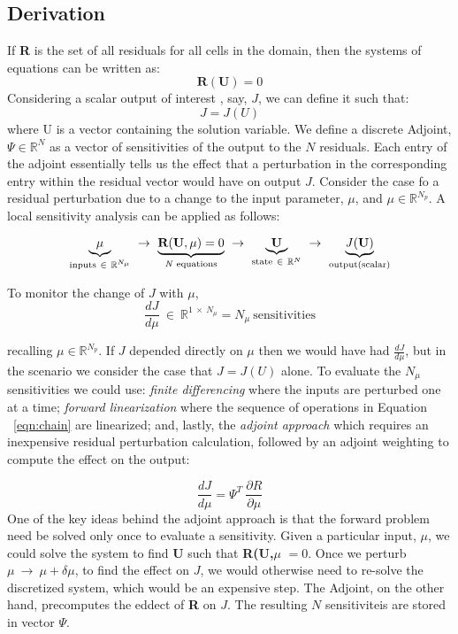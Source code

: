 \subsection{Derivation}
If \textbf{R} is the set of all residuals for all cells in the domain, then the systems of equations can be written as:
\begin{equation}
\textbf{R}(\textbf{U}) = 0
\end{equation}
Considering a scalar output of interest \cite{Fidkowski:2013}, say, $J$, we can define it such that:
\begin{equation}
J = J(U)
\end{equation}
where U is a vector containing the solution variable. We define a discrete Adjoint, $\Psi \in \mathbb{R}^N$ as a vector of sensitivities of the output to the $N$ residuals. Each entry of the adjoint essentially tells us the effect that a perturbation in the corresponding entry within the residual vector would have on output $J$. Consider the case fo a residual perturbation due to a change to the input parameter, $\mu$, and $\mu \in \mathbb{R}^{N_p}$. A local sensitivity analysis can be applied as follows:\par
\begin{equation} \label{eqn:chain}
\underbrace{\mu}_{\text{inputs} ~\in~\mathbb{R}^{N_\mu}} ~\to~ \underbrace{\textbf{R}(\textbf{U},\textbf{$\mu$}) = 0}_{\text{\textit{N} equations}} ~ \to ~ \underbrace{\textbf{U}}_{\text{state} ~\in~ \mathbb{R}^N} ~\to~ \underbrace{\text{\textit{J}(\textbf{U})}}_\text{output(scalar)} 
\end{equation}

To monitor the change of $J$ with $\mu$,
\begin{equation}
\frac{dJ}{d\mu} ~\in~ \mathbb{R}^{1~\times~N_{\mu}} = N_\mu ~ \text{sensitivities}
\end{equation}

recalling $\mu \in \mathbb{R}^{N_p}$. If $J$ depended directly on $\mu$ then we would have had $\frac{dJ}{d\mu}$, but in the scenario we consider the case that $J = J(U)$ alone. To evaluate the $N_\mu$ sensitivities we could use: \textit{finite differencing} where the inputs are  perturbed one at a time;  \textit{forward linearization} where the sequence of operations in Equation ~\eqref{eqn:chain} are linearized; and, lastly, the \textit{adjoint approach} which requires an inexpensive residual perturbation calculation, followed by an adjoint weighting to compute the effect on the output:\par
\begin{equation}
\frac{dJ}{d\mu} = \Psi^T ~\frac{\partial R}{\partial \mu}
\end{equation}
One of the key ideas behind the adjoint approach is that the forward problem need be solved only once to evaluate a sensitivity. Given a particular input, $\mu$, we could solve the system to find \textbf{U} such that \textbf{R(U,$\mu$} $ = 0$. Once we perturb $\mu ~\to~ \mu + \delta \mu$, to find the effect on $J$, we would otherwise need to re-solve the discretized system, which would be an expensive step. The Adjoint, on the other hand, precomputes the eddect of \textbf{R} on $J$. The resulting $N$ sensitiviteis are stored in vector $\Psi$.\par


